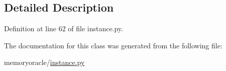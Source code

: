 \subsection{Detailed Description}


Definition at line 62 of file instance.\+py.



The documentation for this class was generated from the following file\+:\begin{DoxyCompactItemize}
\item 
memoryoracle/\hyperlink{instance_8py}{instance.\+py}\end{DoxyCompactItemize}

